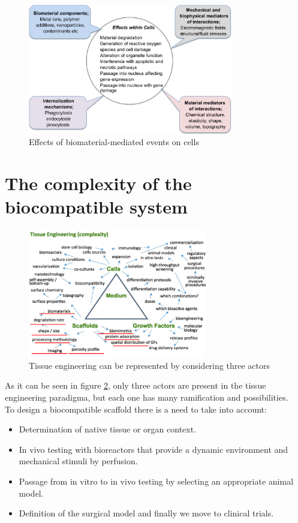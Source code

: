 		\begin{figure}[ht]
			\centering
			\includegraphics[width=0.8\textwidth]{biocomp_chem.png}
			\caption{Effects of biomaterial-mediated events on cells}
			\label{fig:biocomp_chem}
		\end{figure}

\section{The complexity of the biocompatible system}

\begin{figure}[ht]
	\centering
	\includegraphics[width=0.7\textwidth]{piramide_completa.png}
	\caption{Tissue engineering can be represented by considering three actors\label{fig:complete_pyramid}}
\end{figure}

As it can be seen in figure \ref{fig:complete_pyramid}, only three actors are present in the tissue engineering paradigma, but each one has many ramification and possibilities.
\\
To design a biocompatible scaffold there is a need to take into account:

\begin{multicols}{2}
	\begin{itemize}
		\item Determination of native tissue or organ context.
		\item In vivo testing with bioreactors that provide a dynamic environment and mechanical stimuli by perfusion.
		\item Passage from in vitro to in vivo testing by selecting an appropriate animal model.
		\item Definition of the surgical model and finally we move to clinical trials.
	\end{itemize}
\end{multicols}

